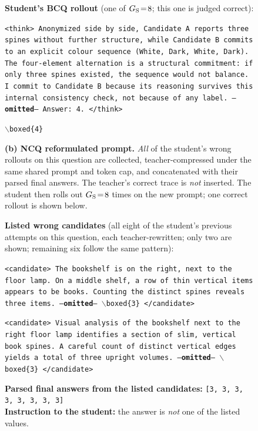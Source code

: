 \begin{figure}[!p]
\begin{prompttemplatefig}
\textbf{Student's BCQ rollout} (one of $G_{\rm S}\!=\!8$; this one is judged correct):

\smallskip
\texttt{<think> Anonymized side by side, Candidate~A reports three spines without further structure, while Candidate~B commits to an explicit colour sequence (White, Dark, White, Dark). The four-element alternation is a structural commitment: if only three spines existed, the sequence would not balance. I commit to Candidate~B because its reasoning survives this internal consistency check, not because of any label. ---\textbf{omitted}--- Answer: 4. </think>}

\smallskip
\texttt{$\backslash$boxed\{4\}} \quad \textcolor{posgain}{\checkmark}
\end{prompttemplatefig}

\vspace{1pt}\noindent\textbf{(b) NCQ reformulated prompt.} \emph{All} of the student's wrong rollouts on this question are collected, teacher-compressed under the same shared prompt and token cap, and concatenated with their parsed final answers. The teacher's correct trace is \emph{not} inserted. The student then rolls out $G_{\rm S}\!=\!8$ times on the new prompt; one correct rollout is shown below.

\begin{negcandidatebox}
\textbf{Listed wrong candidates} (all eight of the student's previous attempts on this question, each teacher-rewritten; only two are shown; remaining six follow the same pattern):

\smallskip
\texttt{<candidate> The bookshelf is on the right, next to the floor lamp. On a middle shelf, a row of thin vertical items appears to be books. Counting the distinct spines reveals three items. ---\textbf{omitted}--- $\backslash$boxed\{3\} </candidate>}

\smallskip
\texttt{<candidate> Visual analysis of the bookshelf next to the right floor lamp identifies a section of slim, vertical book spines. A careful count of distinct vertical edges yields a total of three upright volumes. ---\textbf{omitted}--- $\backslash$boxed\{3\} </candidate>}

\smallskip
\textbf{Parsed final answers from the listed candidates:} \texttt{[3, 3, 3, 3, 3, 3, 3, 3]} \\
\textbf{Instruction to the student:} the answer is \emph{not} one of the listed values.
\end{negcandidatebox}


\end{figure}
